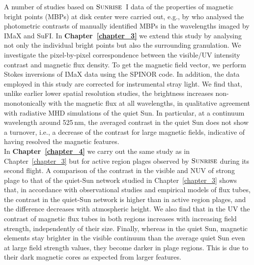 \documentclass[goettingen, gauss, print]{thesis}
\begin{document}
A number of studies based on $\textsc{Sunrise}$~I data of the properties of magnetic bright points (MBPs) at disk center were carried out, e.g., by \cite{riethmuller_bright_2010} who analysed the photometric contrasts of manually identified MBPs in the wavelengths imaged by IMaX and SuFI. %
In \textbf{Chapter~\ref{chapter_3}} we extend this study by analysing not only the individual bright points but also the surrounding granulation. We investigate the pixel-by-pixel correspondence between the visible/UV intensity contrast and magnetic flux density. To get the magnetic field vector, we perform Stokes inversions of IMaX data using the SPINOR code. In addition, the data employed in this study are corrected for instrumental stray light. We find that, unlike earlier lower spatial resolution studies, the brightness increases non-monotonically with the magnetic flux at all wavelengths, in qualitative agreement with radiative MHD simulations of the quiet Sun. In particular, at a continuum wavelength around 525\,nm, the averaged contrast in the quiet Sun does not show a turnover, i.e., a decrease of the contrast for large magnetic fields, indicative of having resolved the magnetic features.\\

In \textbf{Chapter~\ref{chapter_4}} we carry out the same study as in Chapter~\ref{chapter_3} but for active region plages observed by $\textsc{Sunrise}$ during its second flight. A comparison of the contrast in the visible and NUV of strong plage to that of the quiet-Sun network studied in Chapter~\ref{chapter_3} shows that, in accordance with observational studies and empirical models of flux tubes, the contrast in the quiet-Sun network
is higher than in active region plages, and the difference decreases with atmospheric height. We also find that in the UV the contrast of magnetic flux tubes in both regions increases with increasing field strength, independently of their size. Finally, whereas in the quiet Sun, magnetic elements stay brighter in the visible continuum than the average quiet Sun even at large field strength values, they become darker in plage regions. This is due to their dark magnetic cores as expected from larger features. 
\end{document}
